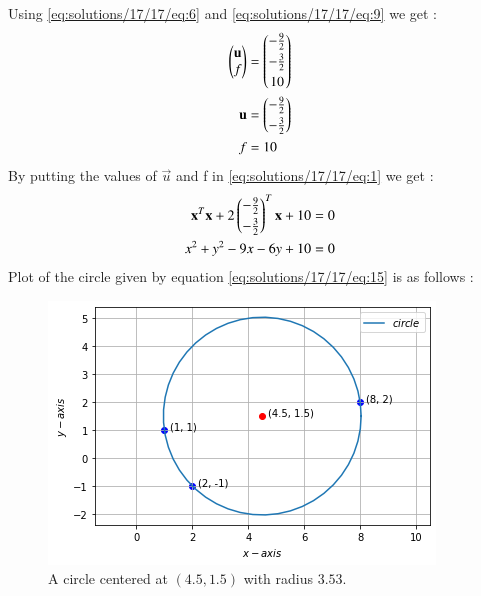 Using \eqref{eq:solutions/17/17/eq:6} and \eqref{eq:solutions/17/17/eq:9} we get : 
\begin{align}
\begin{pmatrix}\mathbf{u}\\f\end{pmatrix}&=\begin{pmatrix}-\frac{9}{2}\\[0.1cm]-\frac{3}{2}\\[0.1cm]10\end{pmatrix}\\
\mathbf{u}&=\begin{pmatrix}-\frac{9}{2}\\[0.1cm]-\frac{3}{2}\end{pmatrix}\\
f&=10   
\end{align}
By putting the values of $\vec{u}$ and f in \eqref{eq:solutions/17/17/eq:1} we get : 
\begin{align}
\mathbf{x}^T\mathbf{x}+2\begin{pmatrix}-\frac{9}{2}\\[0.1cm]-\frac{3}{2}\end{pmatrix}^T\mathbf{x}+10&=0\label{eq:solutions/17/17/eq:14}\\
x^2+y^2-9x-6y+10&=0\label{eq:solutions/17/17/eq:15}
\end{align}
Plot of the circle given by equation \eqref{eq:solutions/17/17/eq:15} is as follows :
\begin{figure}[h]
\centering
    \includegraphics[width=\columnwidth]{solutions/17/17/circle3.png}
    \caption{A circle centered at $(4.5, 1.5)$ with radius $3.53$.}
    \label{eq:solutions/17/17/circle}
\end{figure}

